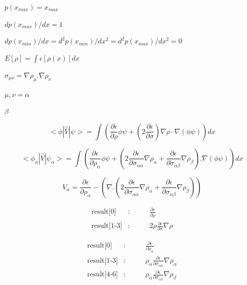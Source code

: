 \documentclass{article}
\begin{document}
$p(x_{max})=x_{max}$
\pagebreak

$dp(x_{max})/dx=1$
\pagebreak

$dp(x_{min})/dx=d^2p(x_{min})/dx^2=d^2p(x_{max})/dx^2=0$
\pagebreak

$ E[\rho] = \int \epsilon[\rho(x)] dx$
\pagebreak

$ \sigma_{\mu \nu} = \nabla \rho_{\mu} . \nabla \rho_{\nu} $
\pagebreak

$ \mu, \nu = \alpha$
\pagebreak

$ \beta $
\pagebreak

\[
  < \phi | \hat V | \psi > = \int \left( \frac{\partial \epsilon}{\partial \rho} \phi \psi
                 +  \left( 2 \frac{\partial \epsilon}{\partial \sigma} \right)
                 \nabla \rho \cdot \nabla \left( \phi \psi \right) \right) dx
\]
\pagebreak

\[
  < \phi_{\alpha} | \hat V | \psi_{\alpha} > = \int \left( \frac{\partial \epsilon}{\partial \rho_{\alpha}} \phi \psi
           +  \left( 2 \frac{\partial \epsilon}{\partial \sigma_{\alpha \alpha}} \nabla \rho_{\alpha}
           + \frac{\partial \epsilon}{\partial \sigma_{\alpha \beta}} \nabla \rho_{\beta}  \right) . \nabla \left( \phi \psi \right) \right) dx
\]
\pagebreak

\[
   V_{\alpha} =  \frac{\partial \epsilon}{\partial \rho_{\alpha}}
                 - \left(\nabla . \left(2 \frac{\partial \epsilon}{\partial \sigma_{\alpha \alpha}} \nabla \rho_{\alpha}
                 + \frac{\partial \epsilon}{\partial \sigma_{\alpha \beta}} \nabla \rho_{\beta}  \right)  \right)
\]
\pagebreak

\begin{eqnarray*}
    \mbox{result[0]}    &:& \qquad \frac{\partial \epsilon}{\partial \rho} \\
    \mbox{result[1-3]}  &:& \qquad 2 \rho \frac{\partial \epsilon}{\partial \sigma} \nabla\rho
\end{eqnarray*}
\pagebreak

\begin{eqnarray*}
    \mbox{result[0]}    &:& \qquad \frac{\partial \epsilon}{\partial \rho_{\alpha}} \\
    \mbox{result[1-3]}  &:& \qquad \rho_\alpha \frac{\partial \epsilon}{\partial \sigma_{\alpha \alpha}} \nabla\rho_\alpha\\
    \mbox{result[4-6]}  &:& \qquad \rho_\alpha \frac{\partial \epsilon}{\partial \sigma_{\alpha \beta}} \nabla\rho_\beta
\end{eqnarray*}
\pagebreak
\end{document}
